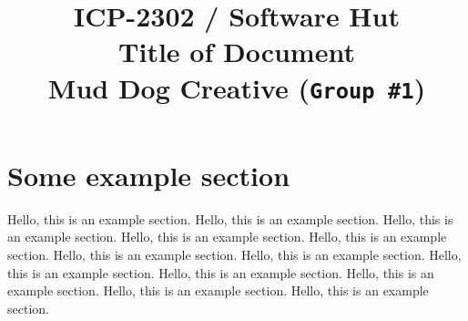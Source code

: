 \documentclass[pdftex,a4paper,10pt,titlepage]{article}
\begin{document}
\title{\textbf{ICP-2302 / Software Hut} \\
Title of Document \\ 
Mud Dog Creative (\texttt{Group \#1})}

\maketitle



\pagebreak




\pagestyle{fancy}
\fancyhf{}
\cfoot{\thepage}



\begin{versionhistory}
\end{versionhistory}

\tableofcontents
\pagebreak


\section{Some example section}
Hello, this is an example section. Hello, this is an example section. Hello, this is an example section. Hello, this is an example section. Hello, this is an example section. Hello, this is an example section. Hello, this is an example section. Hello, this is an example section. Hello, this is an example section. Hello, this is an example section. Hello, this is an example section. Hello, this is an example section. \\




\end{document}
